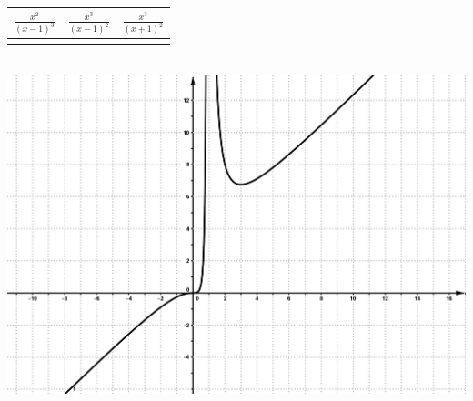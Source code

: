 \documentclass[a4paper,11pt,spanish,sans]{exam}
\newcommand{\Ts}{\rule{0pt}{2.8ex}}       %
\newcommand{\Bs}{\rule[-1.5ex]{0pt}{0pt}} %
\begin{document}
\begin{minipage}{0.5\textwidth}
	\centering
	\label{mc1}
	\begin{tabular}{|c|c|c|}
		\hline
		$\frac{x^2}{(x-1)^3}$  & $\frac{x^3}{(x-1)^2}$ & $\frac{x^3}{(x+1)^2}$ \Ts \Bs   \\ \hline
		&   &      \\ \hline
	\end{tabular}\\
	\centering
	\includegraphics[width= 0.95\linewidth]{integradora1.png}
\end{minipage}
\end{document}
